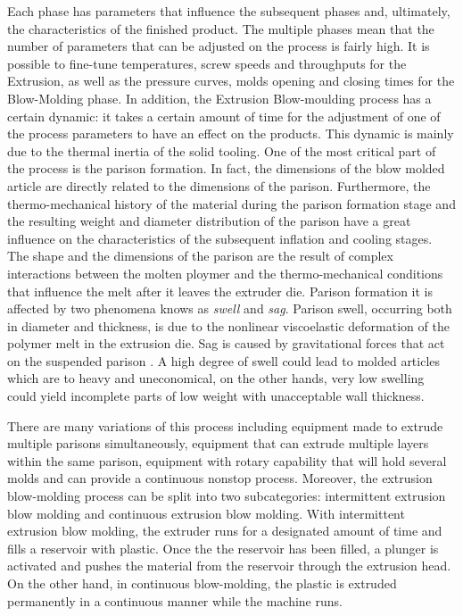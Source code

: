 Each phase has parameters that inﬂuence the subsequent phases and, ultimately, the characteristics of the ﬁnished product. The multiple phases mean that the number of parameters that can be adjusted on the process is fairly high. It is possible to fine-tune temperatures, screw speeds and throughputs for the Extrusion, as well as the  pressure curves, molds opening and closing times for the Blow-Molding phase. In addition, the Extrusion Blow-moulding process has a certain dynamic: it takes a certain amount of time for the adjustment of one of the process parameters to have an effect on the products. This dynamic is mainly due to the thermal inertia of the solid tooling.
One of the most critical part of the process is the parison formation. In fact, the dimensions of the blow molded article are directly related to the dimensions of the parison. Furthermore, the thermo-mechanical history of the material during the parison formation stage and the resulting weight and diameter distribution of the parison have a great influence on the characteristics of the subsequent inflation and cooling stages. The shape and the dimensions of the parison are the result of complex interactions between the molten ploymer and the thermo-mechanical conditions that influence the melt after it leaves the extruder die. Parison formation it is affected by two phenomena knows as \textit{swell} and \textit{sag}. Parison swell, occurring both in diameter and thickness, is due to the nonlinear viscoelastic deformation of the polymer melt in the extrusion die. Sag is caused by gravitational forces that act on the suspended parison \citep{huang2002prediction}. A high degree of swell could lead to molded articles which are to heavy and uneconomical, on the other hands, very low swelling could yield incomplete parts of low weight with unacceptable wall thickness.

There are many variations of this process including equipment made to extrude multiple parisons simultaneously, equipment that can extrude multiple layers within the same parison, equipment with rotary capability that will hold several molds and can provide a continuous nonstop process. Moreover, the extrusion blow-molding process can be split into two subcategories: intermittent extrusion blow molding and continuous extrusion blow molding. With intermittent extrusion blow molding, the extruder runs for a designated amount of time and fills a reservoir with plastic. Once the the reservoir has been filled, a plunger is activated and pushes the material from the reservoir through the extrusion head. On the other hand, in continuous blow-molding, the plastic is extruded permanently in a continuous manner while the machine runs.

